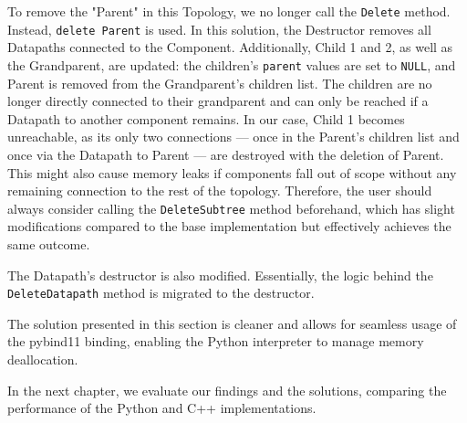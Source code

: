 To remove the "Parent" in this Topology, we no longer call the \verb|Delete| method. Instead, \verb|delete Parent| is used. In this solution, the Destructor removes all Datapaths connected to the Component. Additionally, Child 1 and 2, as well as the Grandparent, are updated: the children's \verb|parent| values are set to \texttt{NULL}, and Parent is removed from the Grandparent's children list. The children are no longer directly connected to their grandparent and can only be reached if a Datapath to another component remains. In our case, Child 1 becomes unreachable, as its only two connections — once in the Parent's children list and once via the Datapath to Parent — are destroyed with the deletion of Parent. This might also cause memory leaks if components fall out of scope without any remaining connection to the rest of the topology. Therefore, the user should always consider calling the \verb|DeleteSubtree| method beforehand, which has slight modifications compared to the base implementation but effectively achieves the same outcome.

The Datapath's destructor is also modified. Essentially, the logic behind the \verb|DeleteDatapath| method is migrated to the destructor.

The solution presented in this section is cleaner and allows for seamless usage of the pybind11 binding, enabling the Python interpreter to manage memory deallocation.

In the next chapter, we evaluate our findings and the solutions, comparing the performance of the Python and C++ implementations.